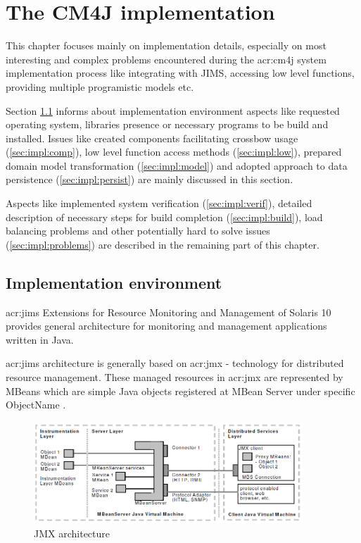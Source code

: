 \documentclass[11pt]{book}
\begin{document}
  \chapter{The CM4J implementation}
  \label{chap:impl}
	
      This chapter focuses mainly on implementation details, especially on most interesting and complex problems encountered during the \gls{acr:cm4j} 
      system implementation process  like integrating with JIMS, accessing low level functions, providing multiple programistic models etc.
		
      Section \ref{sec:impl:env} informs about implementation environment aspects like requested operating system,
      libraries presence or necessary programs to be build and installed. Issues like created components facilitating crossbow usage  (\ref{sec:impl:comp}), 
      low level function access methods (\ref{sec:impl:low}), prepared domain model transformation (\ref{sec:impl:model}) and adopted
     approach to data persistence (\ref{sec:impl:persist}) are mainly discussed in this section.

    Aspects like implemented system verification (\ref{sec:impl:verif}), detailed description of necessary steps for build completion (\ref{sec:impl:build}), 
    load balancing problems and other potentially hard to solve issues (\ref{sec:impl:problems}) are described in the remaining part of this chapter.


    \section{Implementation environment}
    \label{sec:impl:env}

      \gls{acr:jims} Extensions for Resource Monitoring and Management of Solaris 10 provides general architecture for
      monitoring and management applications written in Java. 

      \gls{acr:jims} architecture is generally based on \gls{acr:jmx} - technology for distributed resource management.
      These managed resources in \gls{acr:jmx} are represented by MBeans which are simple Java objects registered at MBean Server
      under specific ObjectName \cite{jims}.
    
      \begin{figure}[H]
        \begin{center}
          \includegraphics[width=0.9\textwidth]{img/jims/jmx.png}
        \end{center}
        \caption{JMX architecture \cite{jims}}
      \end{figure}
	
\end{document}
